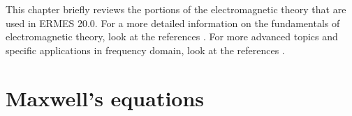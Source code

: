 %
%

This chapter briefly reviews the portions of the electromagnetic theory that are used in ERMES 20.0. For a more detailed information on the fundamentals of electromagnetic theory, look at the references \cite{Jackson, Griffiths, ProperTheory, LorrainCorson, Stratton, WangsnessIng, Ritz-MilfordIng}. For more advanced topics and specific applications in frequency domain, look at the references \cite{Balanis, HarringtonTime-Harmonic, Cessenat}.

\section{Maxwell's equations}

